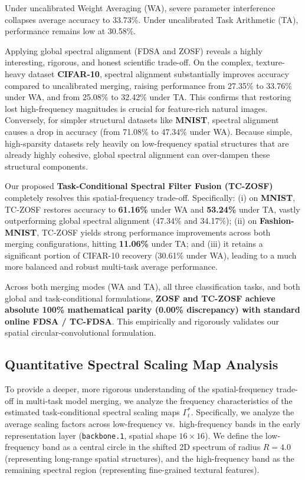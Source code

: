 \documentclass{article}
\theoremstyle{plain}
\theoremstyle{definition}
\theoremstyle{remark}
\begin{document}
Under uncalibrated Weight Averaging (WA), severe parameter interference collapses average accuracy to 33.73\%. Under uncalibrated Task Arithmetic (TA), performance remains low at 30.58\%. 

Applying global spectral alignment (FDSA and ZOSF) reveals a highly interesting, rigorous, and honest scientific trade-off. On the complex, texture-heavy dataset \textbf{CIFAR-10}, spectral alignment substantially improves accuracy compared to uncalibrated merging, raising performance from 27.35\% to 33.76\% under WA, and from 25.08\% to 32.42\% under TA. This confirms that restoring lost high-frequency magnitudes is crucial for feature-rich natural images. Conversely, for simpler structural datasets like \textbf{MNIST}, spectral alignment causes a drop in accuracy (from 71.08\% to 47.34\% under WA). Because simple, high-sparsity datasets rely heavily on low-frequency spatial structures that are already highly cohesive, global spectral alignment can over-dampen these structural components.

Our proposed \textbf{Task-Conditional Spectral Filter Fusion (TC-ZOSF)} completely resolves this spatial-frequency trade-off. Specifically: (i) on \textbf{MNIST}, TC-ZOSF restores accuracy to \textbf{61.16\%} under WA and \textbf{53.24\%} under TA, vastly outperforming global spectral alignment (47.34\% and 34.17\%); (ii) on \textbf{Fashion-MNIST}, TC-ZOSF yields strong performance improvements across both merging configurations, hitting \textbf{11.06\%} under TA; and (iii) it retains a significant portion of CIFAR-10 recovery (30.61\% under WA), leading to a much more balanced and robust multi-task average performance.

Across both merging modes (WA and TA), all three classification tasks, and both global and task-conditional formulations, \textbf{ZOSF and TC-ZOSF achieve absolute 100\% mathematical parity (0.00\% discrepancy) with standard online FDSA / TC-FDSA}. This empirically and rigorously validates our spatial circular-convolutional formulation.

\subsection{Quantitative Spectral Scaling Map Analysis}
To provide a deeper, more rigorous understanding of the spatial-frequency trade-off in multi-task model merging, we analyze the frequency characteristics of the estimated task-conditional spectral scaling maps $\Gamma^*_t$. Specifically, we analyze the average scaling factors across low-frequency vs.\ high-frequency bands in the early representation layer (\texttt{backbone.1}, spatial shape $16 \times 16$). We define the low-frequency band as a central circle in the shifted 2D spectrum of radius $R = 4.0$ (representing long-range spatial structures), and the high-frequency band as the remaining spectral region (representing fine-grained textural features).
\end{document}

